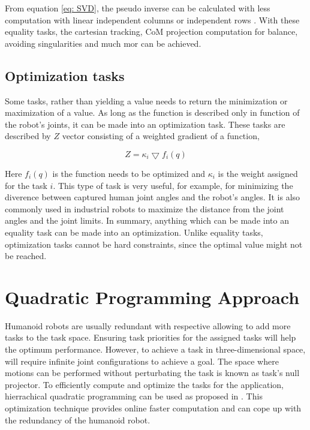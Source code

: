 From equation \ref{eq: SVD}, the pseudo inverse can be calculated with less computation with linear independent columns or independent rows \cite{louisepouble}. 
With these equality tasks, the cartesian tracking, CoM projection computation for balance, avoiding singularities and much mor can be achieved.


\subsection{Optimization tasks}

Some tasks, rather than yielding a value needs to return the minimization or maximization of a value. As long as the function is described only in function of the robot’s 
joints, it can be made into an optimization task. These tasks are described by $Z$ vector consisting of a weighted gradient of a function,

\begin{equation}
    \label{eq:optimization-task}
    Z = \kappa_i \bigtriangledown f_i(q)
\end{equation}

Here $f_i(q)$ is the function needs to be optimized and $\kappa_i$ is the weight assigned for the task $i$. This type of task is very useful, for example, for minimizing the diverence 
between captured human joint angles and the robot’s angles. It is also commonly used in industrial robots to maximize the distance from the joint angles and the joint limits. In summary, 
anything which can be made into an equality task can be made into an optimization. Unlike equality tasks, optimization tasks cannot be hard constraints, since the optimal value might not be reached.

\section{Quadratic Programming Approach}

Humanoid robots are usually redundant with respective allowing to add more tasks to the task space. Ensuring task priorities for the assigned tasks 
will help the optimum performance. However, to achieve a task in three-dimensional space, will require infinite joint configurations to achieve a goal.
The space where motions can be performed without perturbating the task is known as task's null projector.
To efficiently compute and optimize the tasks for the application, hierrachical quadratic programming can be used as proposed in \cite{escande2013planning}. This
optimization technique provides  online faster computation and can cope up with the redundancy of the humanoid robot.


